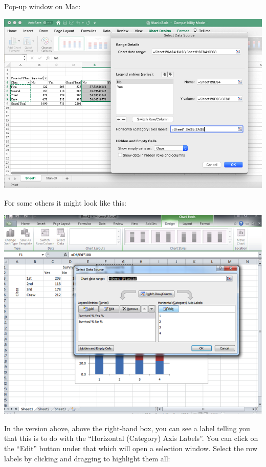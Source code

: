 \documentclass[
]{book}
\begin{document}
Pop-up window on Mac:

\includegraphics{imgs/horizontalcataxislabels.png}

For some others it might look like this:

\includegraphics{imgs/stacked_col_4.png}

In the version above, above the right-hand box, you can see a label telling you that this is to do with the ``Horizontal (Category) Axis Labels''. You can click on the ``Edit'' button under that which will open a selection window. Select the row labels by clicking and dragging to highlight them all:
\end{document}
